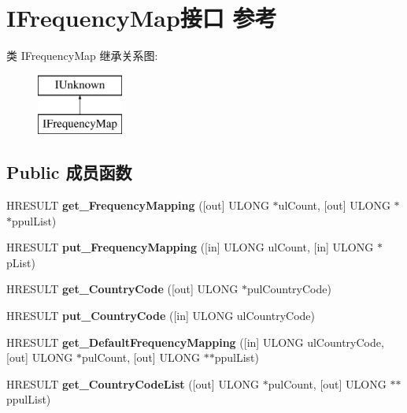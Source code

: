 \hypertarget{interface_i_frequency_map}{}\section{I\+Frequency\+Map接口 参考}
\label{interface_i_frequency_map}
类 I\+Frequency\+Map 继承关系图\+:\begin{figure}[H]
\begin{center}
\leavevmode
\includegraphics[height=2.000000cm]{interface_i_frequency_map}
\end{center}
\end{figure}
\subsection*{Public 成员函数}
\begin{DoxyCompactItemize}
\item 
\mbox{\label{interface_i_frequency_map_a2d122bc3d3f803c0a0e1d8686dc6e4e3}} 
H\+R\+E\+S\+U\+LT {\bfseries get\+\_\+\+Frequency\+Mapping} (\mbox{[}out\mbox{]} U\+L\+O\+NG $\ast$ul\+Count, \mbox{[}out\mbox{]} U\+L\+O\+NG $\ast$$\ast$ppul\+List)
\item 
\mbox{\label{interface_i_frequency_map_a5c783fff6a5145336182f926ef7a4fed}} 
H\+R\+E\+S\+U\+LT {\bfseries put\+\_\+\+Frequency\+Mapping} (\mbox{[}in\mbox{]} U\+L\+O\+NG ul\+Count, \mbox{[}in\mbox{]} U\+L\+O\+NG $\ast$p\+List)
\item 
\mbox{\label{interface_i_frequency_map_a1fe250bb8b2002709d9b4d3e5547a6a6}} 
H\+R\+E\+S\+U\+LT {\bfseries get\+\_\+\+Country\+Code} (\mbox{[}out\mbox{]} U\+L\+O\+NG $\ast$pul\+Country\+Code)
\item 
\mbox{\label{interface_i_frequency_map_a28daac536daf1898b26b9ffc3973e0f3}} 
H\+R\+E\+S\+U\+LT {\bfseries put\+\_\+\+Country\+Code} (\mbox{[}in\mbox{]} U\+L\+O\+NG ul\+Country\+Code)
\item 
\mbox{\label{interface_i_frequency_map_a7b5ad6225dcbf3932a81ec97460b8a9d}} 
H\+R\+E\+S\+U\+LT {\bfseries get\+\_\+\+Default\+Frequency\+Mapping} (\mbox{[}in\mbox{]} U\+L\+O\+NG ul\+Country\+Code, \mbox{[}out\mbox{]} U\+L\+O\+NG $\ast$pul\+Count, \mbox{[}out\mbox{]} U\+L\+O\+NG $\ast$$\ast$ppul\+List)
\item 
\mbox{\label{interface_i_frequency_map_af55db8b48a78cd4d09436341e63fcd03}} 
H\+R\+E\+S\+U\+LT {\bfseries get\+\_\+\+Country\+Code\+List} (\mbox{[}out\mbox{]} U\+L\+O\+NG $\ast$pul\+Count, \mbox{[}out\mbox{]} U\+L\+O\+NG $\ast$$\ast$ppul\+List)
\end{DoxyCompactItemize}
